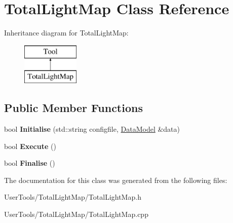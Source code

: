 \hypertarget{classTotalLightMap}{\section{Total\-Light\-Map Class Reference}
\label{classTotalLightMap}
}
Inheritance diagram for Total\-Light\-Map\-:\begin{figure}[H]
\begin{center}
\leavevmode
\includegraphics[height=2.000000cm]{classTotalLightMap}
\end{center}
\end{figure}
\subsection*{Public Member Functions}
\begin{DoxyCompactItemize}
\item 
\hypertarget{classTotalLightMap_ac687c503a670297e4a07b2dee19c5fb5}{bool {\bfseries Initialise} (std\-::string configfile, \hyperlink{classDataModel}{Data\-Model} \&data)}\label{classTotalLightMap_ac687c503a670297e4a07b2dee19c5fb5}

\item 
\hypertarget{classTotalLightMap_a8c2a005f4cdbbeb491a18cb99c4d2fc8}{bool {\bfseries Execute} ()}\label{classTotalLightMap_a8c2a005f4cdbbeb491a18cb99c4d2fc8}

\item 
\hypertarget{classTotalLightMap_afeb9bd48e4fea881d42033ec63122ff9}{bool {\bfseries Finalise} ()}\label{classTotalLightMap_afeb9bd48e4fea881d42033ec63122ff9}

\end{DoxyCompactItemize}


The documentation for this class was generated from the following files\-:\begin{DoxyCompactItemize}
\item 
User\-Tools/\-Total\-Light\-Map/Total\-Light\-Map.\-h\item 
User\-Tools/\-Total\-Light\-Map/Total\-Light\-Map.\-cpp\end{DoxyCompactItemize}
